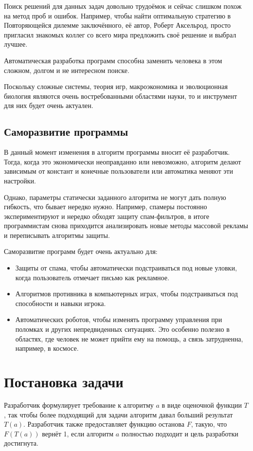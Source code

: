 \documentclass[utf8,a5paper,portrait,10pt]{eskdtext}
\begin{document}
Поиск решений для данных задач довольно трудоёмок и сейчас слишком похож на
метод проб и ошибок. Например, чтобы найти оптимальную стратегию в Повторяющейся
дилемме заключённого, её автор, Роберт Аксельрод, просто пригласил знакомых
коллег со всего мира предложить своё решение и выбрал лучшее.\cite{dilemma}

Автоматическая разработка программ способна заменить человека в этом сложном,
долгом и не интересном поиске.

Поскольку сложные системы, теория игр, макроэкономика и эволюционная биология
являются очень востребованными областями науки, то и инструмент для них будет
очень актуален.

\subsection{Саморазвитие программы}

В данный момент изменения в алгоритм программы вносит её разработчик. Тогда,
когда это экономически неоправданно или невозможно, алгоритм делают зависимым
от констант и конечные пользователи или автоматика меняют эти настройки.

Однако, параметры статически заданного алгоритма не могут дать полную гибкость,
что бывает нередко нужно. Например, спамеры постоянно экспериментируют и нередко
обходят защиту спам-фильтров, в итоге программистам снова приходится
анализировать новые методы массовой рекламы и переписывать алгоритмы защиты.

Саморазвитие программ будет очень актуально для:
\begin{itemize}
  \item Защиты от спама, чтобы автоматически подстраиваться под новые уловки,
        когда пользователь отмечает письмо как рекламное.
  \item Алгоритмов противника в компьютерных играх, чтобы подстраиваться под
        способности и навыки игрока.
  \item Автоматических роботов, чтобы изменять программу управления при
        поломках и других непредвиденных ситуациях.\cite{damage} Это особенно
        полезно в областях, где человек не может прийти ему на помощь, а связь
        затрудненна, например, в космосе.
\end{itemize}

\newpage
\section{Постановка задачи}
Разработчик формулирует требование к алгоритму $a$ в виде оценочной
функции $T$, так чтобы более подходящий для задачи алгоритм давал больший
результат $T(a)$. Разработчик также предоставляет функцию останова $F$, такую,
что $F(T(a))$ вернёт 1, если алгоритм $a$ полностью подходит и цель разработки
достигнута.
\end{document}
